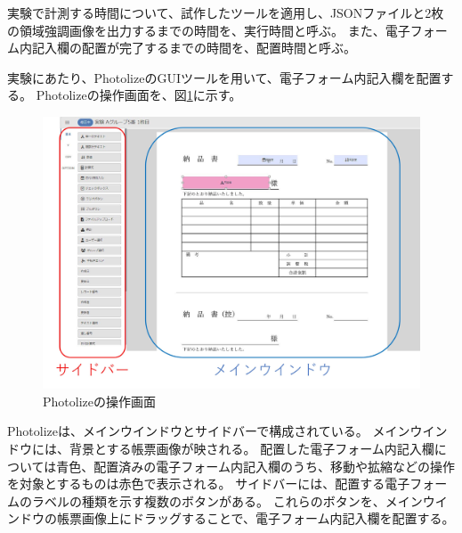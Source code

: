 実験で計測する時間について、試作したツールを適用し、JSONファイルと2枚の領域強調画像を出力するまでの時間を、実行時間と呼ぶ。
また、電子フォーム内記入欄の配置が完了するまでの時間を、配置時間と呼ぶ。

実験にあたり、PhotolizeのGUIツールを用いて、電子フォーム内記入欄を配置する。
Photolizeの操作画面を、図\ref{fig:photolize}に示す。
\begin{figure}[tp]
    \begin{center}
        \includegraphics[width=15cm]{image/06-discussion/photolize.jpg}
        \caption{Photolizeの操作画面}
        \label{fig:photolize}
    \end{center}
\end{figure}
Photolizeは、メインウインドウとサイドバーで構成されている。
メインウインドウには、背景とする帳票画像が映される。
配置した電子フォーム内記入欄については青色、配置済みの電子フォーム内記入欄のうち、移動や拡縮などの操作を対象とするものは赤色で表示される。
サイドバーには、配置する電子フォームのラベルの種類を示す複数のボタンがある。
これらのボタンを、メインウインドウの帳票画像上にドラッグすることで、電子フォーム内記入欄を配置する。

